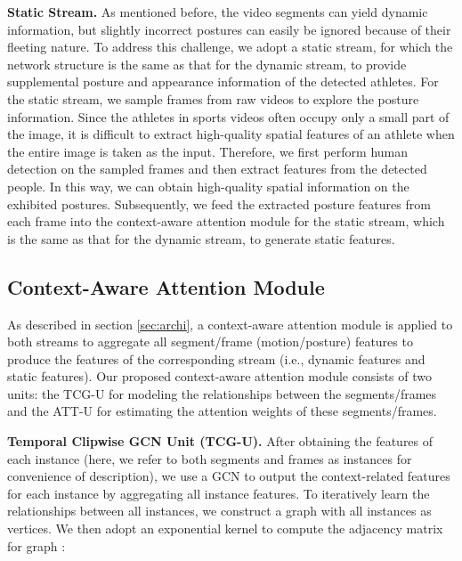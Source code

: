 \documentclass[sigconf]{acmart}
\begin{document}
\vspace{5pt}

\noindent\textbf{Static Stream.} As mentioned before, the video segments can yield dynamic information, but slightly incorrect postures can easily be ignored because of their fleeting nature. To address this challenge, we adopt a static stream, for which the network structure is the same as that for the dynamic stream, to provide supplemental posture and appearance information of the detected athletes. For the static stream, we sample frames from raw videos to explore the posture information. Since the athletes in sports videos often occupy only a small part of the image, it is difficult to extract high-quality spatial features of an athlete when the entire image is taken as the input. Therefore, we first perform human detection on the sampled frames and then extract features from the detected people. In this way, we can obtain high-quality spatial information on the exhibited postures. Subsequently, we feed the extracted posture features from each frame into the context-aware attention module for the static stream, which is the same as that for the dynamic stream, to generate static features.

\vspace{-0.1cm}
\subsection{Context-Aware Attention Module} \label{sec:attention}

As described in section \ref{sec:archi}, a context-aware attention module is applied to both streams to aggregate all segment/frame (motion/posture) features to produce the features of the corresponding stream (i.e., dynamic features and static features). Our proposed context-aware attention module consists of two units: the TCG-U for modeling the relationships between the segments/frames and the ATT-U for estimating the attention weights of these segments/frames.

\vspace{5pt}

\noindent\textbf{Temporal Clipwise GCN Unit (TCG-U).} After obtaining the features  of each instance (here, we refer to both segments and frames as instances for convenience of description), we use a GCN to output the context-related features  for each instance by aggregating all instance features. To iteratively learn the relationships between all instances, we construct a graph  with all instances as vertices. We then adopt an exponential kernel \cite{zhong2019graph} to compute the adjacency matrix  for graph :
\end{document}
